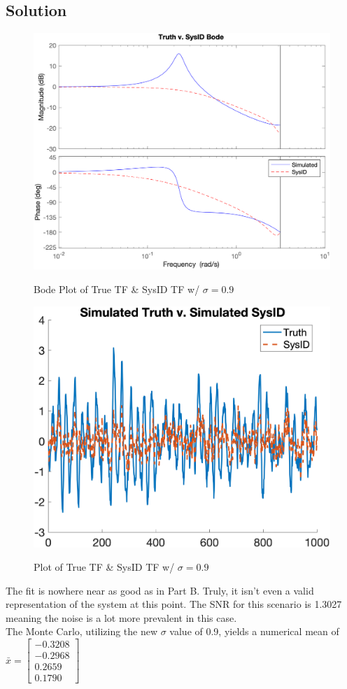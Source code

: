 \documentclass{article}
\begin{document}
\subsection*{Solution}
\begin{figure}[H]
    \centering
    \includegraphics[width=0.75\linewidth]{../figures/p4d_bode.png}\label{fig:p4d_bode}
    \caption{Bode Plot of True TF \& SysID TF w/ $\sigma=0.9$}
\end{figure}
\begin{figure}[H]
    \centering
    \includegraphics[width=0.75\linewidth]{../figures/p4d_tf.png}\label{fig:p4d_tf}
    \caption{Plot of True TF \& SysID TF w/ $\sigma=0.9$}
\end{figure}
The fit is nowhere near as good as in Part B. Truly, it isn't even a valid representation of the system at this point.  The SNR for this scenario 
is 1.3027 meaning the noise is a lot more prevalent in this case. \\
The Monte Carlo, utilizing the new $\sigma$ value of 0.9, yields a numerical mean of $\bar{x} = \begin{bmatrix} -0.3208 \\ -0.2968 \\ 0.2659 \\ 0.1790 \end{bmatrix}$
\end{document}
